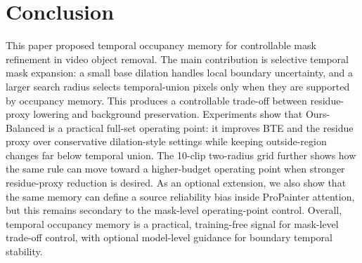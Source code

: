 \documentclass[nouppercase]{kaia}
\begin{document}
\section{Conclusion}
This paper proposed temporal occupancy memory for controllable mask refinement in video object removal. The main contribution is selective temporal mask expansion: a small base dilation handles local boundary uncertainty, and a larger search radius selects temporal-union pixels only when they are supported by occupancy memory. This produces a controllable trade-off between residue-proxy lowering and background preservation. Experiments show that Ours-Balanced is a practical full-set operating point: it improves BTE and the residue proxy over conservative dilation-style settings while keeping outside-region changes far below temporal union. The 10-clip two-radius grid further shows how the same rule can move toward a higher-budget operating point when stronger residue-proxy reduction is desired. As an optional extension, we also show that the same memory can define a source reliability bias inside ProPainter attention, but this remains secondary to the mask-level operating-point control. Overall, temporal occupancy memory is a practical, training-free signal for mask-level trade-off control, with optional model-level guidance for boundary temporal stability.

\clearpage

\end{document}
